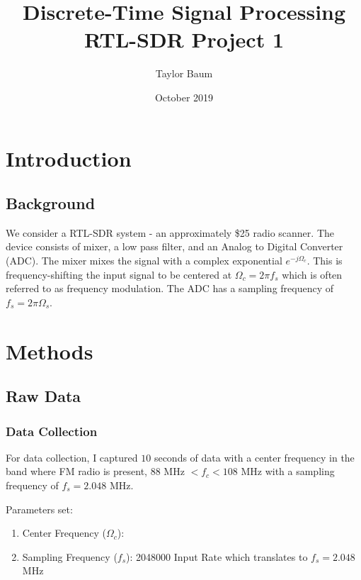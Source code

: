 \documentclass{article}
\title{Discrete-Time Signal Processing RTL-SDR Project 1}
\author{Taylor Baum}
\date{October 2019}
\begin{document}
\maketitle

\section{Introduction}

\subsection{Background}

We consider a RTL-SDR system - an approximately \$25 radio scanner. The device consists of mixer, a low pass filter, and an Analog to Digital Converter (ADC). The mixer mixes the signal with a complex exponential $e^{-j\Omega_c}$. This is frequency-shifting the input signal to be centered at $\Omega_c = 2\pi f_s$ which is often referred to as frequency modulation. The ADC has a sampling frequency of $f_s = 2\pi\Omega_s$.

\section{Methods}

\subsection{Raw Data}

\subsubsection{Data Collection}

For data collection, I captured $10$ seconds of data with a center frequency in the band where FM radio is present, $88$ MHz $ < f_c < 108$ MHz with a sampling frequency of $f_s = 2.048$ MHz.

\noindent Parameters set:
\begin{enumerate}
    \item Center Frequency ($\Omega_c$):  %
    \item Sampling Frequency ($f_s$): 2048000 Input Rate which translates to $f_s = 2.048$ MHz %
\end{enumerate}
\end{document}
